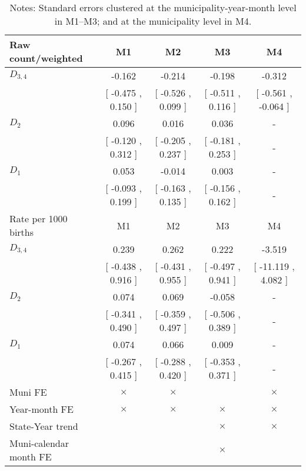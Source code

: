 \begin{table}[!ht]
\centering
\caption{Effects of Drought on vlbw}\label{tab:twfe_vlbw}
\fontsize{10pt}{12pt}\selectfont
\begin{tabular}{lcccc}
\toprule
  Raw count/weighted &\multicolumn{1}{c}{M1}&\multicolumn{1}{c}{M2}&\multicolumn{1}{c}{M3}&\multicolumn{1}{c}{M4} \\
\midrule
 $ D_{3,4} $ &    -0.162 &    -0.214 &    -0.198 &    -0.312 \\ 
 & [    -0.475 ,     0.150 ] & [    -0.526 ,     0.099 ] & [    -0.511 ,     0.116 ] & [    -0.561 ,    -0.064 ] \\ 
\addlinespace
 $ D_2 $ &     0.096 &     0.016 &     0.036 & - \\ 
 & [    -0.120 ,     0.312 ] & [    -0.205 ,     0.237 ] & [    -0.181 ,     0.253 ] & - \\ 
\addlinespace
 $ D_1 $ &     0.053 &    -0.014 &     0.003 & - \\ 
 & [    -0.093 ,     0.199 ] & [    -0.163 ,     0.135 ] & [    -0.156 ,     0.162 ] & - \\ 
\addlinespace
\midrule
  Rate per 1000 births &\multicolumn{1}{c}{M1}&\multicolumn{1}{c}{M2}&\multicolumn{1}{c}{M3}&\multicolumn{1}{c}{M4} \\
\midrule
 $ D_{3,4} $ &     0.239 &     0.262 &     0.222 &    -3.519 \\ 
 & [    -0.438 ,     0.916 ] & [    -0.431 ,     0.955 ] & [    -0.497 ,     0.941 ] & [   -11.119 ,     4.082 ] \\ 
\addlinespace
 $ D_2 $ &     0.074 &     0.069 &    -0.058 & - \\ 
 & [    -0.341 ,     0.490 ] & [    -0.359 ,     0.497 ] & [    -0.506 ,     0.389 ] & - \\ 
\addlinespace
 $ D_1 $ &     0.074 &     0.066 &     0.009 & - \\ 
 & [    -0.267 ,     0.415 ] & [    -0.288 ,     0.420 ] & [    -0.353 ,     0.371 ] & - \\ 
\midrule
  Muni FE & $ \times $ & $ \times $ &  & $ \times $  \\
  Year-month FE & $ \times $ & $ \times $ & $ \times $ & $ \times $ \\
  State-Year trend &  &  & $ \times $ & $ \times $ \\
  Muni-calendar month FE &  &  & $ \times $ & \\
\bottomrule
\end{tabular}
\caption*{\footnotesize{Notes: Standard errors clustered at the municipality-year-month level in M1--M3; and at the municipality level in M4.}}
\end{table}
